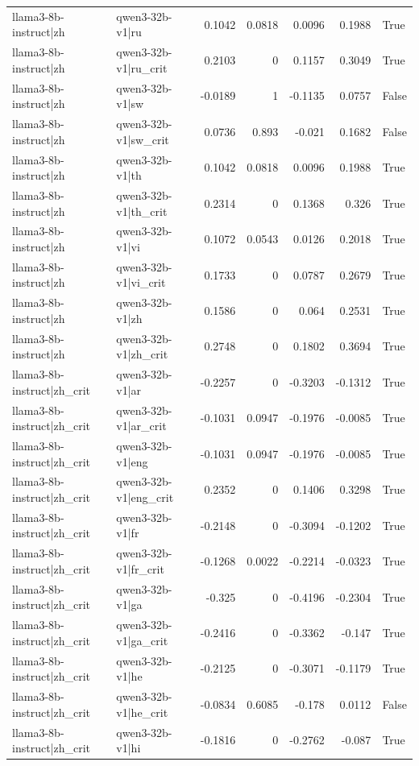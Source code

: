\begin{table}
\begin{tabular}{l l r r r r l}
llama3-8b-instruct|zh & qwen3-32b-v1|ru & 0.1042 & 0.0818 & 0.0096 & 0.1988 & True \\
llama3-8b-instruct|zh & qwen3-32b-v1|ru_crit & 0.2103 & 0 & 0.1157 & 0.3049 & True \\
llama3-8b-instruct|zh & qwen3-32b-v1|sw & -0.0189 & 1 & -0.1135 & 0.0757 & False \\
llama3-8b-instruct|zh & qwen3-32b-v1|sw_crit & 0.0736 & 0.893 & -0.021 & 0.1682 & False \\
llama3-8b-instruct|zh & qwen3-32b-v1|th & 0.1042 & 0.0818 & 0.0096 & 0.1988 & True \\
llama3-8b-instruct|zh & qwen3-32b-v1|th_crit & 0.2314 & 0 & 0.1368 & 0.326 & True \\
llama3-8b-instruct|zh & qwen3-32b-v1|vi & 0.1072 & 0.0543 & 0.0126 & 0.2018 & True \\
llama3-8b-instruct|zh & qwen3-32b-v1|vi_crit & 0.1733 & 0 & 0.0787 & 0.2679 & True \\
llama3-8b-instruct|zh & qwen3-32b-v1|zh & 0.1586 & 0 & 0.064 & 0.2531 & True \\
llama3-8b-instruct|zh & qwen3-32b-v1|zh_crit & 0.2748 & 0 & 0.1802 & 0.3694 & True \\
llama3-8b-instruct|zh_crit & qwen3-32b-v1|ar & -0.2257 & 0 & -0.3203 & -0.1312 & True \\
llama3-8b-instruct|zh_crit & qwen3-32b-v1|ar_crit & -0.1031 & 0.0947 & -0.1976 & -0.0085 & True \\
llama3-8b-instruct|zh_crit & qwen3-32b-v1|eng & -0.1031 & 0.0947 & -0.1976 & -0.0085 & True \\
llama3-8b-instruct|zh_crit & qwen3-32b-v1|eng_crit & 0.2352 & 0 & 0.1406 & 0.3298 & True \\
llama3-8b-instruct|zh_crit & qwen3-32b-v1|fr & -0.2148 & 0 & -0.3094 & -0.1202 & True \\
llama3-8b-instruct|zh_crit & qwen3-32b-v1|fr_crit & -0.1268 & 0.0022 & -0.2214 & -0.0323 & True \\
llama3-8b-instruct|zh_crit & qwen3-32b-v1|ga & -0.325 & 0 & -0.4196 & -0.2304 & True \\
llama3-8b-instruct|zh_crit & qwen3-32b-v1|ga_crit & -0.2416 & 0 & -0.3362 & -0.147 & True \\
llama3-8b-instruct|zh_crit & qwen3-32b-v1|he & -0.2125 & 0 & -0.3071 & -0.1179 & True \\
llama3-8b-instruct|zh_crit & qwen3-32b-v1|he_crit & -0.0834 & 0.6085 & -0.178 & 0.0112 & False \\
llama3-8b-instruct|zh_crit & qwen3-32b-v1|hi & -0.1816 & 0 & -0.2762 & -0.087 & True \\

\end{tabular}
\end{table}
